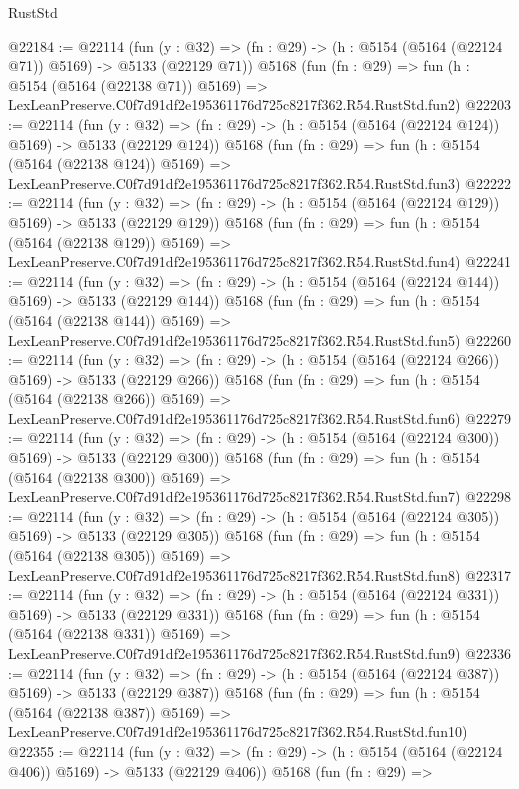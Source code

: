 \begin{lexlean}{RustStd}
\begin{coremodule}
@22184 := @22114
    (fun (y : @32) => (fn : @29) -> (h : @5154 (@5164 (@22124 @71)) @5169) -> @5133 (@22129 @71))
    @5168
    (fun (fn : @29) =>
    fun (h : @5154 (@5164 (@22138 @71)) @5169) =>
    LexLeanPreserve.C0f7d91df2e195361176d725c8217f362.R54.RustStd.fun2)
@22203 := @22114
    (fun (y : @32) => (fn : @29) -> (h : @5154 (@5164 (@22124 @124)) @5169) -> @5133 (@22129 @124))
    @5168
    (fun (fn : @29) =>
    fun (h : @5154 (@5164 (@22138 @124)) @5169) =>
    LexLeanPreserve.C0f7d91df2e195361176d725c8217f362.R54.RustStd.fun3)
@22222 := @22114
    (fun (y : @32) => (fn : @29) -> (h : @5154 (@5164 (@22124 @129)) @5169) -> @5133 (@22129 @129))
    @5168
    (fun (fn : @29) =>
    fun (h : @5154 (@5164 (@22138 @129)) @5169) =>
    LexLeanPreserve.C0f7d91df2e195361176d725c8217f362.R54.RustStd.fun4)
@22241 := @22114
    (fun (y : @32) => (fn : @29) -> (h : @5154 (@5164 (@22124 @144)) @5169) -> @5133 (@22129 @144))
    @5168
    (fun (fn : @29) =>
    fun (h : @5154 (@5164 (@22138 @144)) @5169) =>
    LexLeanPreserve.C0f7d91df2e195361176d725c8217f362.R54.RustStd.fun5)
@22260 := @22114
    (fun (y : @32) => (fn : @29) -> (h : @5154 (@5164 (@22124 @266)) @5169) -> @5133 (@22129 @266))
    @5168
    (fun (fn : @29) =>
    fun (h : @5154 (@5164 (@22138 @266)) @5169) =>
    LexLeanPreserve.C0f7d91df2e195361176d725c8217f362.R54.RustStd.fun6)
@22279 := @22114
    (fun (y : @32) => (fn : @29) -> (h : @5154 (@5164 (@22124 @300)) @5169) -> @5133 (@22129 @300))
    @5168
    (fun (fn : @29) =>
    fun (h : @5154 (@5164 (@22138 @300)) @5169) =>
    LexLeanPreserve.C0f7d91df2e195361176d725c8217f362.R54.RustStd.fun7)
@22298 := @22114
    (fun (y : @32) => (fn : @29) -> (h : @5154 (@5164 (@22124 @305)) @5169) -> @5133 (@22129 @305))
    @5168
    (fun (fn : @29) =>
    fun (h : @5154 (@5164 (@22138 @305)) @5169) =>
    LexLeanPreserve.C0f7d91df2e195361176d725c8217f362.R54.RustStd.fun8)
@22317 := @22114
    (fun (y : @32) => (fn : @29) -> (h : @5154 (@5164 (@22124 @331)) @5169) -> @5133 (@22129 @331))
    @5168
    (fun (fn : @29) =>
    fun (h : @5154 (@5164 (@22138 @331)) @5169) =>
    LexLeanPreserve.C0f7d91df2e195361176d725c8217f362.R54.RustStd.fun9)
@22336 := @22114
    (fun (y : @32) => (fn : @29) -> (h : @5154 (@5164 (@22124 @387)) @5169) -> @5133 (@22129 @387))
    @5168
    (fun (fn : @29) =>
    fun (h : @5154 (@5164 (@22138 @387)) @5169) =>
    LexLeanPreserve.C0f7d91df2e195361176d725c8217f362.R54.RustStd.fun10)
@22355 := @22114
    (fun (y : @32) => (fn : @29) -> (h : @5154 (@5164 (@22124 @406)) @5169) -> @5133 (@22129 @406))
    @5168
    (fun (fn : @29) =>

\end{coremodule}
\end{lexlean}
